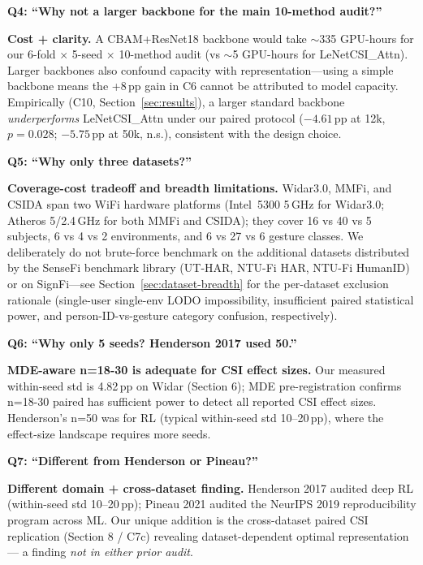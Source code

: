 \documentclass[11pt]{article}
\theoremstyle{definition}
\begin{document}
\medskip
\noindent\textbf{Q4: ``Why not a larger backbone for the main 10-method audit?''}

\noindent\textbf{Cost + clarity.} A CBAM+ResNet18 backbone would take $\sim$335 GPU-hours for our 6-fold $\times$ 5-seed $\times$ 10-method audit (vs $\sim$5 GPU-hours for LeNetCSI\_Attn). Larger backbones also confound capacity with representation---using a simple backbone means the +8\,pp gain in C6 cannot be attributed to model capacity. Empirically (C10, Section~\ref{sec:results}), a larger standard backbone \emph{underperforms} LeNetCSI\_Attn under our paired protocol ($-4.61$\,pp at 12k, $p = 0.028$; $-5.75$\,pp at 50k, n.s.), consistent with the design choice.

\medskip
\noindent\textbf{Q5: ``Why only three datasets?''}

\noindent\textbf{Coverage-cost tradeoff and breadth limitations.} Widar3.0, MMFi, and CSIDA span two WiFi hardware platforms (Intel~5300 5\,GHz for Widar3.0; Atheros 5/2.4\,GHz for both MMFi and CSIDA); they cover 16 vs 40 vs 5 subjects, 6 vs 4 vs 2 environments, and 6 vs 27 vs 6 gesture classes. We deliberately do not brute-force benchmark on the additional datasets distributed by the SenseFi benchmark library (UT-HAR, NTU-Fi HAR, NTU-Fi HumanID) or on SignFi---see Section~\ref{sec:dataset-breadth} for the per-dataset exclusion rationale (single-user single-env LODO impossibility, insufficient paired statistical power, and person-ID-vs-gesture category confusion, respectively).

\medskip
\noindent\textbf{Q6: ``Why only 5 seeds? Henderson 2017 used 50.''}

\noindent\textbf{MDE-aware n=18-30 is adequate for CSI effect sizes.} Our measured within-seed std is 4.82\,pp on Widar (Section 6); MDE pre-registration confirms n=18-30 paired has sufficient power to detect all reported CSI effect sizes. Henderson's n=50 was for RL (typical within-seed std 10--20\,pp), where the effect-size landscape requires more seeds.

\medskip
\noindent\textbf{Q7: ``Different from Henderson or Pineau?''}

\noindent\textbf{Different domain + cross-dataset finding.} Henderson 2017 audited deep RL (within-seed std 10--20\,pp); Pineau 2021 audited the NeurIPS 2019 reproducibility program across ML. Our unique addition is the cross-dataset paired CSI replication (Section 8 / C7c) revealing dataset-dependent optimal representation — a finding \emph{not in either prior audit}.
\end{document}
